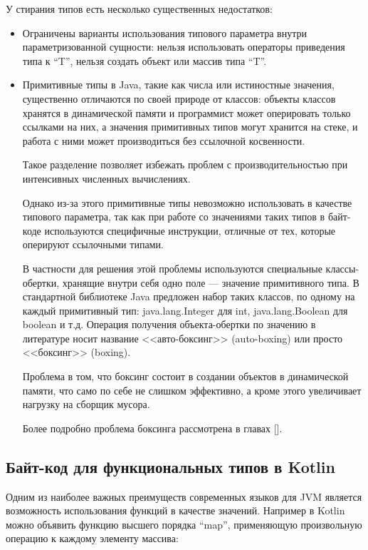 У стирания типов есть несколько существенных недостатков:
\begin{itemize}
    \item Ограничены варианты использования типового параметра внутри параметризованной сущности:
    нельзя использовать операторы приведения типа к ``T'', нельзя создать объект или массив
    типа ``T''.
    \item Примитивные типы в Java, такие как числа или истиностные значения, существенно отличаются
    по своей природе от классов: объекты классов хранятся в динамической памяти и программист
    может оперировать только ссылками на них, а значения примитивных типов могут хранится на стеке,
    и работа с ними может производиться без ссылочной косвенности.

    Такое разделение позволяет избежать проблем с производительностью при интенсивных численных
    вычислениях.

    Однако из-за этого примитивные типы невозможно использовать в качестве типового параметра,
    так как при работе со значениями таких типов в байт-коде используются специфичные инструкции,
    отличные от тех, которые оперируют ссылочными типами.

    В частности для решения этой проблемы используются специальные классы-обертки, хранящие внутри
    себя одно поле --- значение примитивного типа. В стандартной библиотеке Java предложен набор
    таких классов, по одному на каждый примитивный тип: java.lang.Integer для int,
    java.lang.Boolean для boolean и т.д. Операция получения объекта-обертки по значению
    в литературе носит название <<авто-боксинг>> (auto-boxing) или просто <<боксинг>> (boxing).

    Проблема в том, что боксинг состоит в создании объектов в динамической памяти, что само по себе
    не слишком эффективно, а кроме этого увеличивает нагрузку на сборщик мусора.

    Более подробно проблема боксинга рассмотрена в главах []. %
\end{itemize}

\subsection{Байт-код для функциональных типов в Kotlin}
\label{section:lambda}
Одним из наиболее важных преимуществ современных языков для JVM является возможность использования
функций в качестве значений.
Например в Kotlin можно объявить функцию высшего порядка ``map'', применяющую произвольную операцию
к каждому элементу массива:

